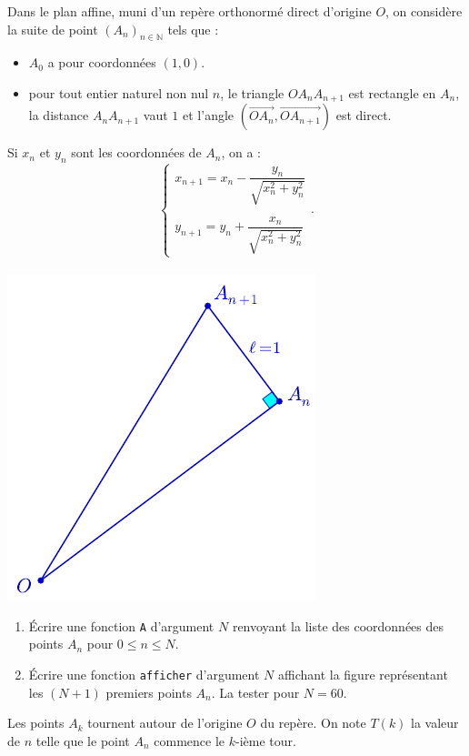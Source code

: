 \begin{exercice}
Dans le plan affine, muni d'un repère orthonormé direct d'origine $O$, on considère la suite de point $(A_n)_{n\in \mathbb{N}}$ tels que :
\begin{itemize}
\item $A_0$ a pour coordonnées $(1,0)$.
\item pour tout entier naturel non nul $n$, le triangle $OA_nA_{n+1}$ est rectangle en $A_n$, la distance $A_nA_{n+1}$ vaut $1$ et l'angle $\left(\overrightarrow{OA_n},\overrightarrow{OA_{n+1}}\right)$ est direct.
\end{itemize}
\begin{multicols}{2}
Si $x_n$ et $y_n$ sont les coordonnées de $A_n$, on a :
$$\begin{cases} x_{n+1}=x_n-\dfrac{y_n}{\sqrt{x_n^2+y_n^2}}\\  \\ y_{n+1} = y_n+\dfrac{x_n}{\sqrt{x_n^2+y_n^2}}\end{cases}.$$
\\ \includegraphics[scale=0.4]{ex24.png}
\end{multicols}
\begin{enumerate}
\item \'Ecrire une fonction \texttt{A} d'argument $N$ renvoyant la liste des coordonnées des points $A_n$ pour $0\leq n\leq N$. 
\item \'Ecrire une fonction \texttt{afficher} d'argument $N$ affichant la figure représentant les $(N+1)$ premiers points $A_n$. La tester pour $N=60$.
\end{enumerate}
Les points $A_k$ tournent autour de l'origine $O$ du repère. On note $T(k)$ la valeur de $n$ telle que le point $A_n$ commence le $k$-ième tour.

\end{exercice}

